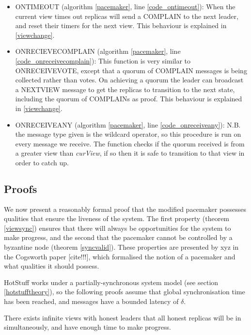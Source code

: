 \begin{itemize}
	\item ON{\large T}IMEOUT (algorithm \ref{pacemaker}, line \ref{code_ontimeout}): When the current view times out replicas will send a COMPLAIN to the next leader, and reset their timers for the next view. This behaviour is explained in \ref{viewchange}.
	\item ON{\large R}ECIEVE{\large C}OMPLAIN (algorithm \ref{pacemaker}, line \ref{code_onreceivecomplain}): This function is very similar to ON{\large R}ECEIVE{\large V}OTE, except that a quorum of COMPLAIN messages is being collected rather than votes. On achieving a quorum the leader can broadcast a NEXT{\large V}IEW message to get the replicas to transition to the next state, including the quorum of COMPLAINs as proof. This behaviour is explained in \ref{viewchange}.
	\item ON{\large R}ECEIVE{\large A}NY (algorithm \ref{pacemaker}, line \ref{code_onreceiveany}): N.B. the message type given is the wildcard operator, so this procedure is run on every message we receive. The function checks if the quorum received is from a greater view than \textit{curView}, if so then it is safe to transition to that view in order to catch up.
\end{itemize}

\subsection{Proofs}

We now present a reasonably formal proof that the modified pacemaker possesses qualities that ensure the liveness of the system. The first property (theorem \ref{viewsync}) ensures that there will always be opportunities for the system to make progress, and the second that the pacemaker cannot be controlled by a byzantine node (theorem \ref{syncvalid}). These properties are presented by xyz in the Cogsworth paper [cite!!!], which formalised the notion of a pacemaker and what qualities it should possess.

HotStuff works under a partially-synchronous system model (see section \ref{hotstufftheory}), so the following proofs assume that global synchronisation time has been reached, and messages have a bounded latency of $\delta$.

\begin{theorem} \label{viewsync}
	There exists infinite views with honest leaders that all honest replicas will be in simultaneously, and have enough time to make progress.
\end{theorem}

